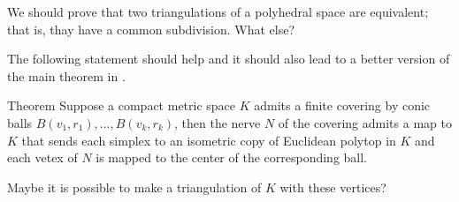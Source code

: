 \documentclass[a4paper,10pt]{article}
\begin{document}
We should prove that two triangulations of a polyhedral space are equivalent;
that is, thay have a common subdivision.
What else?

The following statement should help and it should also lead to a better version of the main theorem in \cite{lebedeva-petrunin}.

\begin{thm}{Theorem}
Suppose a compact metric space $K$ admits a finite covering by conic balls $B(v_1,r_1),\dots,B(v_k,r_k)$,
then the nerve $N$ of the covering admits a map to $K$ that sends each simplex to an isometric copy of Euclidean polytop in $K$ and each vetex of $N$ is mapped to the center of the corresponding ball.
\end{thm}

Maybe it is possible to make a triangulation of $K$ with these vertices?



{\sloppy
\printbibliography[heading=bibintoc]
\fussy
}
\end{document}
